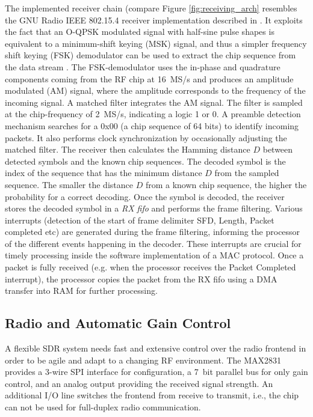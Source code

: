 The implemented receiver chain (compare Figure \ref{fig:receiving_arch} resembles
the GNU Radio IEEE 802.15.4 receiver implementation described in
\cite{Schmid:802.15.4}. It exploits the fact that an O-QPSK modulated signal
with half-sine pulse shapes is equivalent to a minimum-shift keying (MSK)
signal, and thus a simpler frequency shift keying (FSK) demodulator can be
used to extract the chip sequence from the data stream \cite{cmos:rfic}. The
FSK-demodulator uses the in-phase and quadrature components coming from the RF
chip at 16~MS/s and produces an amplitude modulated (AM) signal, where the amplitude
corresponds to the frequency of the incoming signal. A matched filter
integrates the AM signal. The filter is sampled at the chip-frequency of
2~MS/s, indicating a logic 1 or 0. A preamble detection mechanism searches for
a 0x00 (a chip sequence of 64 bits) to identify incoming
packets. It also performs clock synchronization by occasionally adjusting the matched
filter. The receiver then calculates the Hamming distance $D$ between detected
symbols and the known chip sequences. The decoded symbol is the
index of the sequence that has the minimum distance $D$ from the sampled
sequence. The smaller the distance $D$ from a known chip sequence, the higher
the probability for a correct decoding. Once the symbol is decoded, the
receiver stores the decoded symbol in a \emph{RX fifo} and performs the frame
filtering. Various interrupts (detection of the start of frame delimiter SFD,
Length, Packet completed etc) are generated during the frame filtering,
informing the processor of the different events happening in the decoder.
These interrupts are crucial for timely processing inside the software
implementation of a MAC protocol.
Once a packet is fully received (e.g. when the processor receives the Packet Completed 
interrupt), the processor copies the packet from the RX fifo using a DMA
transfer into RAM for further processing.

\subsection{Radio and Automatic Gain Control}

A flexible SDR system needs fast and extensive control over the radio frontend
in order to be agile and adapt to a changing RF environment. The MAX2831
provides a 3-wire SPI interface for configuration, a 7~bit parallel bus for only gain
control, and an analog output providing the received signal strength. An
additional I/O line switches the frontend from receive to transmit, i.e., the
chip can not be used for full-duplex radio communication.

